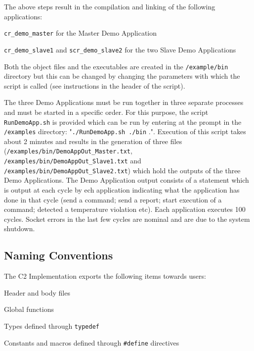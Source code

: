 \documentclass[a4paper,10pt]{article}
\newenvironment{fw_itemize}						%
{\begin{itemize}
  \setlength{\itemsep}{1mm}
  \setlength{\parskip}{0pt}
  \setlength{\parsep}{0pt}}
{\end{itemize}}
\begin{document}
The above steps result in the compilation and linking of the following applications:

\begin{fw_itemize}
\item \texttt{cr\_demo\_master} for the Master Demo Application 
\item \texttt{cr\_demo\_slave1} and \texttt{scr\_demo\_slave2} for the two Slave Demo Applications 
\end{fw_itemize}

Both the object files and the executables are created in the \texttt{/example/bin} directory but this can be changed by changing the parameters with which the script is called (see instructions in the header of the script). 

The three Demo Applications must be run together in three separate processes and must be started in a specific order. For this purpose, the script \texttt{RunDemoApp.sh} is provided which can be run by entering at the prompt in the \texttt{/examples} directory: "\texttt{./RunDemoApp.sh ./bin} .". Execution of this script takes about 2 minutes and results in the generation of three files (\texttt{/examples/bin/DemoAppOut\_Master.txt}, \texttt{/examples/bin/DemoAppOut\_Slave1.txt} and \texttt{/examples/bin/DemoAppOut\_Slave2.txt}) which hold the outputs of the three Demo Applications. The Demo Application output consists of a statement which is output at each cycle by ech application indicating what the application has done in that cycle (send a command; send a report; start execution of a command; detected a temperature violation etc). Each application executes 100 cycles. Socket errors in the last few cycles are nominal and are due to the system shutdown.

\subsection{Naming Conventions}
The C2 Implementation exports the following items towards users:

\begin{fw_itemize}
\item Header and body files
\item Global functions
\item Types defined through \texttt{typedef} 
\item Constants and macros defined through \texttt{\#define} directives
\end{fw_itemize}
\end{document}
